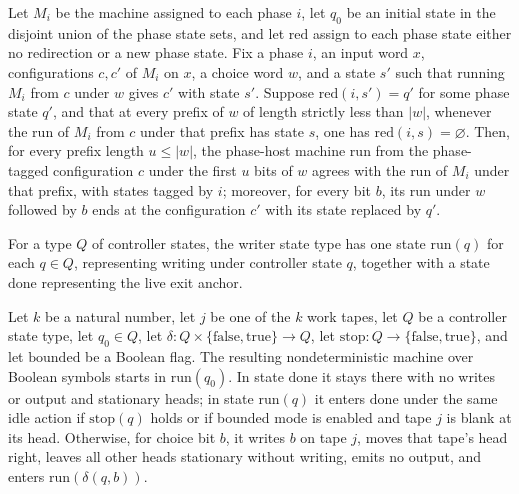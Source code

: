 \begin{theorem}
\label{Turing.NDTM.phaseHostND_run}
\leanok
{}
Let $M_i$ be the machine assigned to each phase $i$, let $q_0$ be an initial state in
the disjoint union of the phase state sets, and let $\mathrm{red}$ assign to each phase
state either no redirection or a new phase state. Fix a phase $i$, an input word $x$,
configurations $c,c'$ of $M_i$ on $x$, a choice word $w$, and a state $s'$ such that
running $M_i$ from $c$ under $w$ gives $c'$ with state $s'$. Suppose
$\mathrm{red}(i,s')=q'$ for some phase state $q'$, and that at every prefix of $w$ of
length strictly less than $|w|$, whenever the run of $M_i$ from $c$ under that prefix
has state $s$, one has $\mathrm{red}(i,s)=\varnothing$. Then, for every prefix length
$u\le |w|$, the phase-host machine run from the phase-tagged configuration $c$ under the
first $u$ bits of $w$ agrees with the run of $M_i$ under that prefix, with states tagged
by $i$; moreover, for every bit $b$, its run under $w$ followed by $b$ ends at the
configuration $c'$ with its state replaced by $q'$.
\end{theorem}

\begin{definition}
\label{Turing.NDWriterState}
\leanok
For a type $Q$ of controller states, the writer state type has one state
$\mathrm{run}(q)$ for each $q\in Q$, representing writing under controller state $q$,
together with a state $\mathrm{done}$ representing the live exit anchor.
\end{definition}

\begin{definition}
\label{Turing.ndWriterTM}
\leanok
{}
Let $k$ be a natural number, let $j$ be one of the $k$ work tapes, let $Q$ be a
controller state type, let $q_0\in Q$, let
$\delta:Q\times\{\mathrm{false},\mathrm{true}\}\to Q$, let
$\mathrm{stop}:Q\to\{\mathrm{false},\mathrm{true}\}$, and let $\mathrm{bounded}$ be a
Boolean flag. The resulting nondeterministic machine over Boolean symbols starts in
$\mathrm{run}(q_0)$. In state $\mathrm{done}$ it stays there with no writes or output
and stationary heads; in state $\mathrm{run}(q)$ it enters $\mathrm{done}$ under the
same idle action if $\mathrm{stop}(q)$ holds or if bounded mode is enabled and tape $j$
is blank at its head. Otherwise, for choice bit $b$, it writes $b$ on tape $j$, moves
that tape's head right, leaves all other heads stationary without writing, emits no
output, and enters $\mathrm{run}(\delta(q,b))$.
\end{definition}

